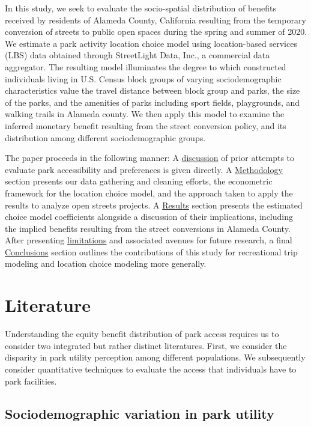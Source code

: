 \documentclass[3p, authoryear, review]{elsarticle} %
\begin{document}
In this study, we seek to evaluate the socio-spatial distribution of benefits received by residents of Alameda County, California resulting from the temporary conversion of streets to public open spaces during the spring and summer of 2020. We estimate a park activity location choice model using location-based services (LBS) data obtained through StreetLight Data, Inc., a commercial data aggregator. The resulting model illuminates the degree to which constructed individuals living in U.S. Census block groups of varying sociodemographic characteristics value the travel distance between block group and parks, the size of the parks, and the amenities of parks including sport fields, playgrounds, and walking trails in Alameda county. We then apply this model to examine the inferred monetary benefit resulting from the street conversion policy, and its distribution among different sociodemographic groups.

The paper proceeds in the following manner: A \protect\hyperlink{literature}{discussion} of prior attempts to evaluate park accessibility and preferences is given directly. A \protect\hyperlink{methodology}{Methodology} section presents our data gathering and cleaning efforts, the econometric framework for the location choice model, and the approach taken to apply the results to analyze open streets projects. A \protect\hyperlink{results}{Results} section presents the estimated choice model coefficients alongside a discussion of their implications, including the implied benefits resulting from the street conversions in Alameda County. After presenting \protect\hyperlink{limitations}{limitations} and associated avenues for future research, a final \protect\hyperlink{conclusions}{Conclusions} section outlines the contributions of this study for recreational trip modeling and location choice modeling more generally.

\hypertarget{literature}{%
\section{Literature}\label{literature}}

Understanding the equity benefit distribution of park access requires us to consider two integrated but rather distinct literatures. First, we consider the disparity in park utility perception among different populations. We subsequently consider quantitative techniques to evaluate the access that individuals have to park facilities.

\hypertarget{sociodemographic-variation-in-park-utility}{%
\subsection{Sociodemographic variation in park utility}\label{sociodemographic-variation-in-park-utility}}
\end{document}
